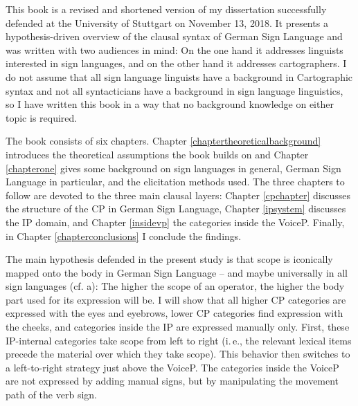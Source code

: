 

\begin{refsection}

This book is a revised and shortened version of my dissertation successfully defended at the University of Stuttgart on November 13, 2018. It presents a hypothe\-sis-driven overview of the clausal syntax of German Sign Language and was written with two audiences in mind: On the one hand it addresses linguists interested in sign languages, and on the other hand it addresses cartographers. I do not assume that all sign language linguists have a background in Cartographic syntax and not all syntacticians have a background in sign language linguistics, so I have written this book in a way that no background knowledge on either topic is required.

The book consists of six chapters. Chapter \ref{chaptertheoreticalbackground} introduces the theoretical assumptions the book builds on and Chapter \ref{chapterone} gives some background on sign languages in general, German Sign Language in particular, and the elicitation methods used. The three chapters to follow are devoted to the three main clausal layers: Chapter \ref{cpchapter} discusses the structure of the CP in German Sign Language, Chapter \ref{ipsystem} discusses the IP domain, and Chapter \ref{insidevp} the categories inside the VoiceP. Finally, in Chapter \ref{chapterconclusions} I conclude the findings.

The main hypothesis defended in the present study is that scope is iconically mapped onto the body in German Sign Language -- and maybe universally in all sign languages (cf. \citealt{bross2017scope}a): The higher the scope of an operator, the higher the body part used for its expression will be. I will show that all higher CP categories are expressed with the eyes and eyebrows, lower CP categories find expression with the cheeks, and categories inside the IP are expressed manually only. First, these IP-internal categories take scope from left to right (i.\,e., the relevant lexical items precede the material over which they take scope). This behavior then switches to a left-to-right strategy just above the VoiceP. The categories inside the VoiceP are not expressed by adding manual signs, but by manipulating the movement path of the verb sign. 

\end{refsection}

